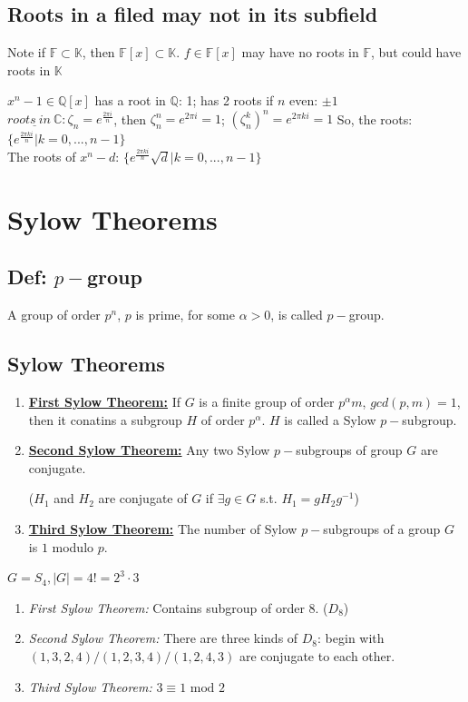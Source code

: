 \documentclass[11pt]{elegantbook}
\begin{document}
{\section{Roots in a filed may not in its subfield}
Note if $\mathbb{F}\subset \mathbb{K}$, then $\mathbb{F}[x]\subset\mathbb{K}$. $f\in\mathbb{F}[x]$ may have no roots in $\mathbb{F}$, but could have roots in $\mathbb{K}$
\begin{example}
    $x^n-1\in\mathbb{Q}[x]$ has a root in $\mathbb{Q}$: 1; has 2 roots if $n$ even: $\pm 1$\\
    $\underline{roots\ in\ \mathbb{C}}:\zeta_n=e^{\frac{2\pi i}{n}}$, then $\zeta_n^n=e^{2\pi i}=1$; $(\zeta_n^k)^n=e^{2\pi ki}=1$ So, the roots: $\{e^{\frac{2\pi ki}{n}}|k=0,...,n-1\}$\\
    The roots of $x^n-d$: $\{e^{\frac{2\pi ki}{n}}\sqrt{d}|k=0,...,n-1\}$\\
\end{example}}





\chapter{Sylow Theorems}
\section{Def: $p-$group}
\begin{definition}
    A group of order $p^n$, $p$ is prime, for some $\alpha>0$, is called $p-$group.
\end{definition}
\section{Sylow Theorems}
\begin{enumerate}[1)]
    \item \underline{\textbf{First Sylow Theorem:}} If $G$ is a finite group of order $p^\alpha m$, $gcd(p,m)=1$, then it conatins a subgroup $H$ of order $p^\alpha$. $H$ is called a Sylow $p-$subgroup.
    \item \underline{\textbf{Second Sylow Theorem:}} Any two Sylow $p-$subgroups of group $G$ are conjugate.
    
    ($H_1$ and $H_2$ are conjugate of $G$ if $\exists g\in G$ s.t. $H_1=gH_2g^{-1}$)
    \item \underline{\textbf{Third Sylow Theorem:}} The number of Sylow $p-$subgroups of a group $G$ is $1$ modulo $p$.
\end{enumerate}
\begin{example}
    $G=S_4,|G|=4!=2^3\cdot 3$
\end{example}
\begin{enumerate}
    \item \textit{First Sylow Theorem:} Contains subgroup of order $8$. ($D_8$)
    \item \textit{Second Sylow Theorem:} There are three kinds of $D_8$: begin with $(1,3,2,4)/(1,2,3,4)/(1,2,4,3)$ are conjugate to each other.
    \item \textit{Third Sylow Theorem:} $3\equiv 1 \text{ mod }2$
\end{enumerate}
\end{document}
